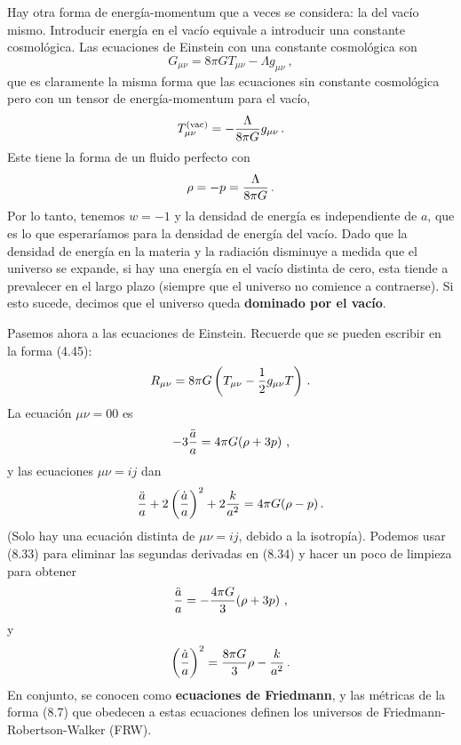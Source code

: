 \documentclass[11pt,b5paper,openany,twoside]{book}
\newcommand{\mn}{{\mu\nu}}
\begin{document}
Hay otra forma de energía-momentum que a veces se considera: la del vacío mismo.
Introducir energía en el vacío equivale a introducir una constante cosmológica.
Las ecuaciones de Einstein con una constante cosmológica son
\begin{equation}
G_\mn = 8\pi GT_\mn -\Lambda g_\mn \ ,\label{8.29}
\end{equation}
que es claramente la misma forma que las ecuaciones sin constante cosmológica pero con un tensor de energía-momentum para el vacío,
\begin{equation}
T^{\rm (vac)}_\mn = -{{\Lambda}\over{8\pi G}}g_\mn\,.\label{8.30}
\end{equation}
Este tiene la forma de un fluido perfecto con
\begin{equation}
\rho = -p = {{\Lambda}\over{8\pi G}}\,.\label{8.31}
\end{equation}
Por lo tanto, tenemos $w=-1$ y la densidad de energía es independiente de $a$, que es lo que esperaríamos para la densidad de energía del vacío.
Dado que la densidad de energía en la materia y la radiación disminuye a medida que el universo se expande, si hay una energía en el vacío distinta de cero, esta tiende a prevalecer en el largo plazo (siempre que el universo no comience a contraerse).
Si esto sucede, decimos que el universo queda {\bf dominado por el vacío}.

Pasemos ahora a las ecuaciones de Einstein.
Recuerde que se pueden escribir en la forma (4.45):
\begin{equation}
R_\mn = 8\pi G\left(T_\mn - {1\over 2}g_\mn T\right)\,.
\label{8.32}
\end{equation}
La ecuación $\mn = 00$ es
\begin{equation}
-3{{\ddot a}\over a}=4\pi G(\rho+3p)\ ,\label{8.33}
\end{equation}
y las ecuaciones $\mn = ij$ dan
\begin{equation}
{{\ddot a}\over a} + 2\left({{\dot a}\over a}\right)^2
+2{k\over{a^2}}= 4\pi G(\rho-p)\,.\label{8.34}
\end{equation}
(Solo hay una ecuación distinta de $\mn = ij$, debido a la isotropía).
Podemos usar (8.33) para eliminar las segundas derivadas en (8.34) y hacer un poco de limpieza para obtener
\begin{equation}
{{\ddot a}\over a}=-{{4\pi G}\over 3}(\rho+3p)\ ,\label{8.35}
\end{equation}
y
\begin{equation}
\left({{\dot a}\over a}\right)^2={{8\pi G}\over 3}\rho
-{{k}\over a^2}\,.\label{8.36}
\end{equation}
En conjunto, se conocen como {\bf ecuaciones de Friedmann}, y las métricas de la forma (8.7) que obedecen a estas ecuaciones definen los universos de Friedmann-Robertson-Walker (FRW).
\end{document}
